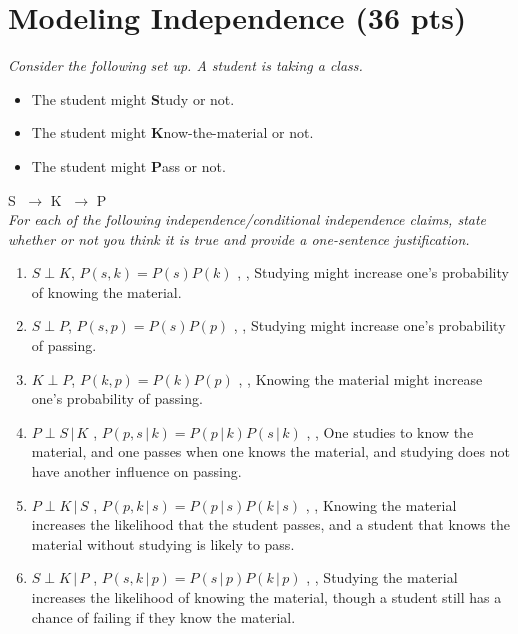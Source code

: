 \documentclass[fleqn]{hw6}
\begin{document}
\section{Modeling Independence (36 pts)}
\textit{Consider the following set up. A student is taking a class. }
\begin{itemize}
	\item The student might \textbf{S}tudy or not.
	\item The student might \textbf{K}now-the-material or not.
	\item The student might \textbf{P}ass or not. 
\end{itemize}  

{\Large \textcircled{\normalsize S}} $ \rightarrow $ {\Large \textcircled{\normalsize K}} $ \rightarrow $ 
{\Large \textcircled{\normalsize P}} \\
$\ $ \\ %

\textit{For each of the following independence/conditional independence claims, state whether or not you think it is true and provide a one-sentence justification.}
\begin{enumerate}
\item \( S \perp K\), $ P(s,k) = P(s)P(k) $ ,   , Studying might increase one's probability of knowing the material.
\item \(S \perp P\), $ P(s,p) = P(s)P(p) $ ,   , Studying might increase one's probability of passing.
\item \(K \perp P \), $ P(k,p) = P(k)P(p) $ ,   , Knowing the material might increase one's probability of passing.
\item \(P \perp S\, |\, K\) , $ P(p,s\, |\, k) = P(p\, |\, k)P(s\, |\, k)$ ,  , One studies to know the material, and one passes when one knows the material, and studying does not have another influence on passing. 
\item \(P\perp K\, |\, S\) , $ P(p,k\, |\, s) = P(p\, |\, s)P(k\, |\, s)$ ,  , Knowing the material increases the likelihood that the student passes, and a student that knows the material without studying is likely to pass.
\item \( S\perp K\, |\, P\) , $ P(s,k\, |\, p) = P(s\, |\, p)P(k\, |\, p)$ ,  , Studying the material increases the likelihood of knowing the material, though a student still has a chance of failing if they know the material.
\end{enumerate}
\end{document}
